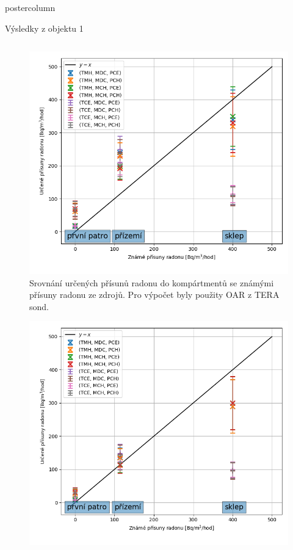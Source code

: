 \documentclass{beamer}
\begin{document}
\begin{frame}
\begin{columns}
\begin{column}{.57\textwidth}
\begin{beamercolorbox}[center]{postercolumn}
\begin{minipage}{.98\textwidth}
{\begin{myblock}{Výsledky z objektu 1}
\begin{columns}
    \begin{column}{.45\textwidth}
    \begin{figure}
        \centering
        \includegraphics[width=\textwidth]{podklady/prisuny_grafy/skala75_errorbar.png}
        \caption{Srovnání určených přísunů radonu do kompártmentů se známými přísuny radonu ze zdrojů. Pro výpočet byly použity OAR z TERA sond.}
        \label{fig:skala75_prisuny_sondy}
    \end{figure}
    \begin{figure}
        \centering
        \includegraphics[width=\textwidth]{podklady/prisuny_grafy/skala75_CANARY_errorbar.png}

\end{figure}
\end{column}
\end{columns}
\end{myblock}}
\end{minipage}
\end{beamercolorbox}
\end{column}
\end{columns}
\end{frame}
\end{document}
